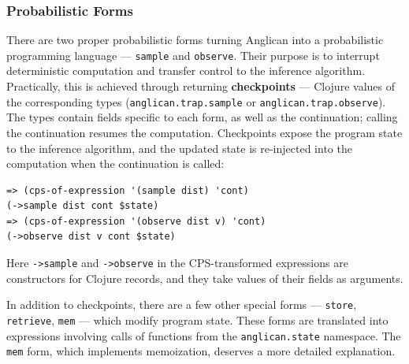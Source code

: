 \documentclass[preprint]{sigplanconf}
\begin{document}
\subsubsection{Probabilistic Forms}
\label{seq:forms}

There are two proper probabilistic forms turning Anglican into a
probabilistic programming language --- \texttt{sample} and
\texttt{observe}. Their purpose is to interrupt deterministic
computation and transfer control to the inference algorithm.
Practically, this is achieved through returning
\textbf{checkpoints} --- Clojure values of the corresponding
types (\texttt{anglican.trap.sample} or
\texttt{anglican.trap.observe}). The types contain fields
specific to each form, as well as the continuation; calling the
continuation resumes the computation. Checkpoints expose the
program state to the inference algorithm, and the updated state
is re-injected into the computation when the continuation is
called:
\begin{lstlisting}[style=default]
=> (cps-of-expression '(sample dist) 'cont)
(->sample dist cont $state)
=> (cps-of-expression '(observe dist v) 'cont)
(->observe dist v cont $state)
\end{lstlisting}
Here \texttt{->sample} and \texttt{->observe} in the CPS-transformed
expressions are constructors for Clojure records, and they take 
values of their fields as arguments.

In addition to checkpoints, there are a few other special forms
---  \texttt{store}, \texttt{retrieve}, \texttt{mem} --- which
modify program state. These forms are translated into
expressions involving calls of functions from the
\texttt{anglican.state} namespace. The \texttt{mem} form, which
implements memoization, deserves a more detailed explanation.
\end{document}
